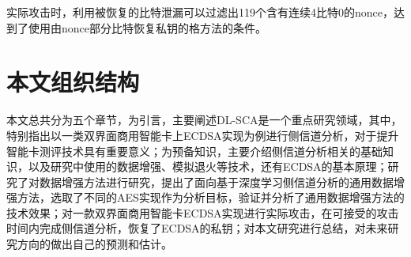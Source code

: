 {	实际攻击时，利用被恢复的比特泄漏可以过滤出119个含有连续4比特0的nonce，达到了使用由nonce部分比特恢复私钥的格方法的条件。
	\section{本文组织结构}
	本文总共分为五个章节，为引言，主要阐述DL-SCA是一个重点研究领域，其中，特别指出以一类双界面商用智能卡上ECDSA实现为例进行侧信道分析，对于提升智能卡测评技术具有重要意义；为预备知识，主要介绍侧信道分析相关的基础知识，以及研究中使用的数据增强、模拟退火等技术，还有ECDSA的基本原理；研究了对数据增强方法进行研究，提出了面向基于深度学习侧信道分析的通用数据增强方法，选取了不同的AES实现作为分析目标，验证并分析了通用数据增强方法的技术效果；对一款双界面商用智能卡ECDSA实现进行实际攻击，在可接受的攻击时间内完成侧信道分析，恢复了ECDSA的私钥；对本文研究进行总结，对未来研究方向的做出自己的预测和估计。
}